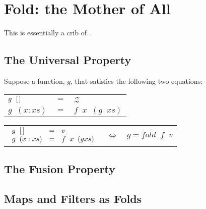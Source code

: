 \section{\color{red}Fold: the Mother of All}

This is essentially a crib of \cite{hutton99tutorial}.

\subsection{\color{red}The Universal Property}

Suppose a function, $g$, that satisfies the following two equations:
\begin{center}
\begin{tabular}{lcl}
  $g\;\;[\,] $ & $=$ & $\mathcal{Z}$\\
  $g\;\;(x:xs)     $ & $=$ & $f\;\;x\;\;(g\;\;xs)$
\end{tabular}
\end{center}

\begin{center}
  \begin{tabular}{lcl}
    $\begin{array}{lcl}
      g\;\;[\,]  &= & v   \\
      g\;\;(x:xs)      &= & f\;\;x\;\;(g xs) 
    \end{array}$
    & $\Leftrightarrow$
    & $g = fold\;\;f\;\;v $
  \end{tabular}
\end{center}

\subsection{\color{red}The Fusion Property}

\subsection{\color{red}Maps and Filters as Folds}